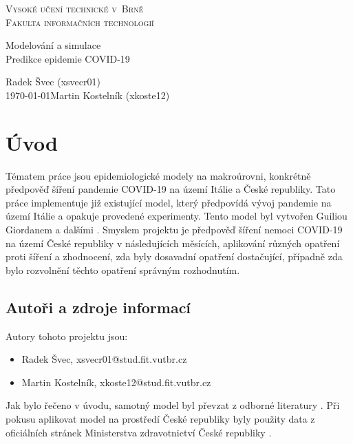 \documentclass[a4paper,11pt]{article}
\begin{document}
	\begin{titlepage}
		\begin{center}
			\textsc{\Huge Vysoké učení technické v~Brně\\
				\vspace{0.4em}\huge Fakulta informačních technologií}
			
			
			{\LARGE Modelování a simulace\\
				\Huge Predikce epidemie COVID-19\\ \vspace{0.3em}}
			
			
			{\Large \hfill Radek Švec (xsvecr01)\\ \today \hfill Martin Kostelník (xkoste12)}
		\end{center}
	\end{titlepage}

	\section{Úvod}
		Tématem práce jsou epidemiologické modely na makroúrovni, konkrétně předpověď šíření pandemie COVID-19 na území Itálie a České republiky. Tato práce implementuje již existující model, který předpovídá vývoj pandemie na území Itálie a opakuje provedené experimenty. Tento model byl vytvořen Guiliou Giordanem a dalšími \cite{source}. Smyslem projektu je předpověď šíření nemoci COVID-19 na území České republiky v následujících měsících, aplikování různých opatření proti šíření a zhodnocení, zda byly dosavadní opatření dostačující, případně zda bylo rozvolnění těchto opatření správným rozhodnutím.
		
	\subsection{Autoři a zdroje informací}
		Autory tohoto projektu jsou:
		\begin{itemize}
			\item Radek Švec, xsvecr01@stud.fit.vutbr.cz
			\item Martin Kostelník, xkoste12@stud.fit.vutbr.cz
		\end{itemize}
	
	Jak bylo řečeno v úvodu, samotný model byl převzat z odborné literatury \cite{source}. Při pokusu aplikovat model na prostředí České republiky byly použity data z oficiálních stránek Ministerstva zdravotnictví České republiky \cite{mzcr}.
	
\end{document}
